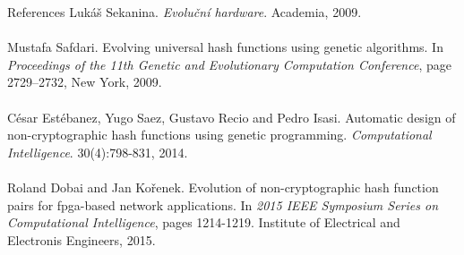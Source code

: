 \documentclass[11pt]{beamer}
\begin{document}
	\begin{frame}{References}
		Luk\'{a}\v{s} Sekanina. \textit{Evolu\v{c}n\'{i} hardware}. Academia, 2009. \\~\\
		
		Mustafa Safdari. Evolving universal hash functions using genetic algorithms.
		In \textit{Proceedings of the 11th Genetic and Evolutionary Computation Conference}, page 2729–2732, New York, 2009. \\~\\
		
		C\'{e}sar Est\'{e}banez, Yugo Saez, Gustavo Recio and Pedro Isasi. Automatic design of non-cryptographic hash functions using 
		genetic programming. \textit{Computational Intelligence}. 30(4):798-831, 2014. \\~\\
		
		Roland Dobai and Jan Ko\v{r}enek. Evolution of non-cryptographic hash function pairs for fpga-based network applications. In 
		\textit{2015 IEEE Symposium Series on Computational Intelligence}, pages 1214-1219. Institute of Electrical and Electronis Engineers, 2015.
	\end{frame}		
\end{document}
